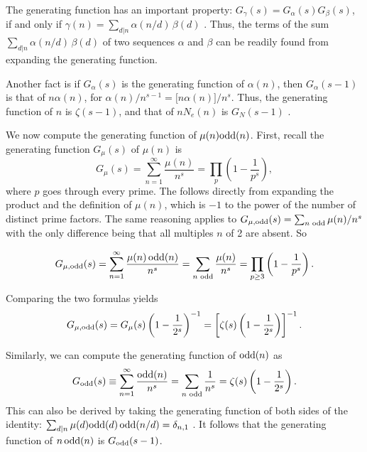\documentclass[twocolumn]{revtex4-1}
\begin{document}
The generating function has an important property:
$G_\gamma(s) = G_\alpha(s) G_\beta(s)$,
if and only if $\gamma(n) = \sum_{d|n} \alpha(n/d)\, \beta(d)$ \cite{hardy}.
Thus,
  the terms of the sum $\sum_{d|n} \alpha(n/d)\, \beta(d)$
  of two sequences $\alpha$ and $\beta$
  can be readily found from expanding the generating function.



Another fact is if $G_\alpha(s)$ is the generating function of $\alpha(n)$,
then $G_\alpha(s-1)$ is that of $n \alpha(n)$,
for $\alpha(n)/n^{s-1} = \big[ n \alpha(n) \big] / n^s$.
Thus, the generating function of $n$ is $\zeta(s-1)$,
and
that of $n N_e(n)$ is $G_N(s-1)$
.



We now compute the generating function of $\mu(n)\mathrm{odd}(n)$.
First, recall the generating function $G_\mu(s)$ of $\mu(n)$ is
\[
  G_\mu(s) = \sum_{n=1}^{\infty} \frac{\mu(n)}{n^s}
  = \prod_p \left( 1 - \frac{1}{p^s} \right),
\]
where $p$ goes through every prime.
%
The follows directly from expanding the product
  and the definition of $\mu(n)$,
which is $-1$ to the power of the number of distinct prime factors.
%
The same reasoning applies to
$G_{\mu, \mathrm{odd}}(s) = \sum_{n \text{ odd}} \mu(n)/n^s$
with the only difference being that all multiples $n$ of 2
are absent. So
%
\begin{small}
\[
  G_{\mu, \mathrm{odd}}(s)
  = \sum_{n=1}^{\infty} \frac{\mu(n) \, \mathrm{odd}(n)}{n^s}
  = \sum_{n \text{ odd}} \frac{\mu(n)}{n^s}
  = \prod_{p \ge 3} \left( 1 - \frac{1}{p^s} \right).
\]
\end{small}
Comparing the two formulas yields
\[
  G_{\mu, \mathrm{odd}}(s)
  = G_{\mu}(s)
  \left(1- \frac{1}{2^s}\right)^{-1}
  =
   \left[ \zeta(s) \left(1- \frac{1}{2^s}\right) \right]^{-1}.
\]



Similarly,
we can compute the generating function of $\mathrm{odd}(n)$ as
\[
  G_{\mathrm{odd}}(s)
  \equiv \sum_{n=1}^{\infty} \frac{\mathrm{odd}(n)}{n^s}
  = \sum_{n \text{ odd}} \frac{1}{n^s}
  = \zeta(s) \left(1 - \frac{1}{2^s} \right).
\]
This can also be derived by taking the generating function of
both sides of the identity:
$\sum_{d|n} \mu(d) \mathrm{odd}(d) \, \mathrm{odd}(n/d) = \delta_{n, 1}$
\big[which is a modification of
$\sum_{d|n} \mu(d) = \delta_{n, 1}$\big].
%
It follows that the generating function of $n \, \mathrm{odd}(n)$ is $G_{\mathrm{odd}}(s-1)$.
\end{document}
